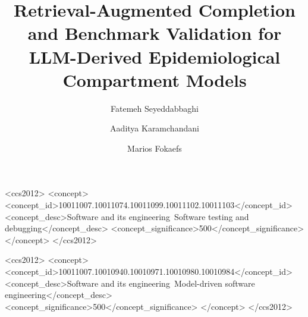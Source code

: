 \documentclass[sigconf,review]{acmart}
\title{Retrieval-Augmented Completion and Benchmark Validation for LLM-Derived Epidemiological Compartment Models}
\author{Fatemeh Seyeddabbaghi}
\affiliation{%
  \institution{York University}
  \city{Toronto}
  \country{Canada}
}
\author{Aaditya Karamchandani}
\affiliation{%
  \institution{York University}
  \city{Toronto}
  \country{Canada}
}
\author{Marios Fokaefs}
\affiliation{%
  \institution{York University}
  \city{Toronto}
  \country{Canada}
}
\begin{document}
\begin{abstract}
    
\end{abstract}



\begin{CCSXML}
<ccs2012>
   <concept>
       <concept_id>10011007.10011074.10011099.10011102.10011103</concept_id>
       <concept_desc>Software and its engineering~Software testing and debugging</concept_desc>
       <concept_significance>500</concept_significance>
       </concept>
 </ccs2012>
\end{CCSXML}

\begin{CCSXML}
<ccs2012>
   <concept>
       <concept_id>10011007.10010940.10010971.10010980.10010984</concept_id>
       <concept_desc>Software and its engineering~Model-driven software engineering</concept_desc>
       <concept_significance>500</concept_significance>
       </concept>
 </ccs2012>
\end{CCSXML}




\maketitle







\newpage

\balance
%



\end{document}
